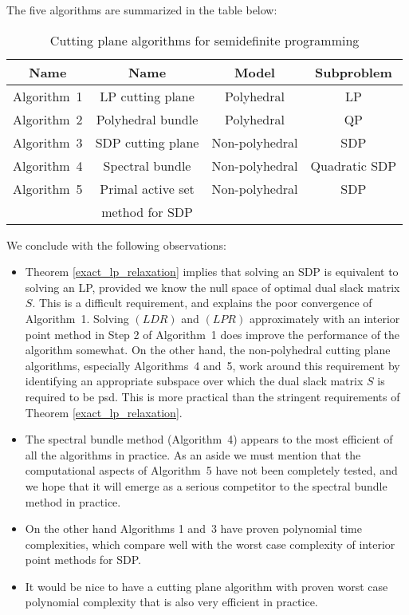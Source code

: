 \documentclass[12pt]{kluwer}
\begin{document}
\begin{article}
The five algorithms are summarized in the table below:
\begin{table}[htbp]
\begin{tabular}{cccc} \hline
Name & Name & Model & Subproblem \\ \hline
Algorithm~1 & LP cutting plane & Polyhedral & LP \\
Algorithm~2 & Polyhedral bundle & Polyhedral & QP \\
Algorithm~3 & SDP cutting plane & Non-polyhedral & SDP \\
Algorithm~4 & Spectral bundle & Non-polyhedral & Quadratic SDP \\
Algorithm~5 & Primal active set & Non-polyhedral & SDP \\ 
& method for SDP & & \\ \hline
\end{tabular}
\caption{Cutting plane algorithms for semidefinite programming}
\end{table}

We conclude with the following observations:
\begin{itemize}
\item Theorem \ref{exact_lp_relaxation} implies that solving an SDP is equivalent to
solving an LP, provided we know the null space of optimal dual slack matrix $S$.
This is a difficult requirement, and explains the poor convergence of Algorithm~1.
Solving $(LDR)$ and $(LPR)$ approximately with an interior point method in Step 2
of Algorithm~1 does improve the performance of the algorithm somewhat.
On the other hand, the non-polyhedral cutting plane algorithms, especially Algorithms~4 and~5,
work around this requirement by identifying an appropriate subspace over which the
dual slack matrix $S$ is required to be psd. This is more practical than the
stringent requirements of Theorem \ref{exact_lp_relaxation}. 
\item The spectral bundle method (Algorithm~4) appears to the most efficient of all
the algorithms in practice. As an aside we must mention that the computational aspects
of Algorithm~5 have not been completely tested, and we hope that it will emerge as a serious
competitor to the spectral bundle method in practice.
\item On the other hand Algorithms 1 and~3 have proven polynomial time complexities,
which compare well with the worst case complexity of interior point methods for SDP.
\item It would be nice to have a cutting plane algorithm with proven worst case polynomial complexity
that is also very efficient in practice.
\end{itemize}


\end{article}
\end{document}

